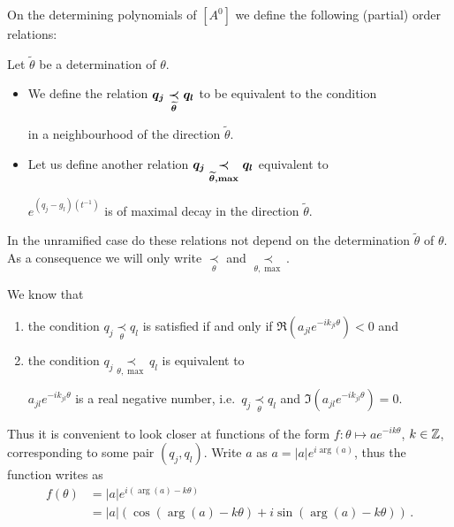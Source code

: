 On the determining polynomials of $[A^0]$ we define the following (partial)
order relations:
\begin{defn}\label{defn:definingRelations}
  Let $\tilde\theta$ be a determination of $\theta$.
  \begin{itemize}
    \item We define the relation
      $\boldmath q_j \underset{\tilde\theta}{\prec} q_l$ to be equivalent to
      the condition
      \begin{einr}
         in a neighbourhood of
        the direction $\tilde\theta$.
      \end{einr}
    \item Let us define another relation
      $\boldmath q_j \underset{\tilde\theta,\max}{\prec} q_l$ equivalent to
      \begin{einr}
        $e^{(q_j-g_l)(t^{-1})}$ is of maximal decay in the direction
        $\tilde\theta$.
      \end{einr}
  \end{itemize}
  \begin{s-rem}
    In the unramified case do these relations not depend on the determination
    $\tilde\theta$ of $\theta$. As a consequence we will only write
    $\underset{\theta}{\prec}$ and $\underset{\theta,\max}{\prec}$.
  \end{s-rem}
\end{defn}
We know that
\begin{enumerate}
  \item the condition $q_j \underset{\theta}{\prec} q_l$ is
    satisfied if and only if $\Re(a_{jl}e^{-ik_{jl}\theta})<0$ and
  \item the condition $q_j \underset{\theta,\max}{\prec} q_l$ is
    equivalent to
    \begin{einr}
      $a_{jl}e^{-ik_{jl}\theta}$ is a real negative
      number, i.e.\ $q_j \underset{\theta}{\prec} q_l$ and
      $\Im(a_{jl}e^{-ik_{jl}\theta})=0$.
    \end{einr}
\end{enumerate}
Thus it is convenient to look closer at functions of the form
$f:\theta\mapsto ae^{-ik\theta}$, $k\in\Z$, corresponding to some pair
$(q_j,q_l)$.
Write $a$ as $a=|a|e^{i\arg(a)}$, thus the function writes as
\begin{align*}
  f(\theta)&=|a|e^{i(\arg(a)-k\theta)}
  \\&=|a|(\cos(\arg(a)-k\theta) + i\sin(\arg(a)-k\theta)) \,.
\end{align*}
